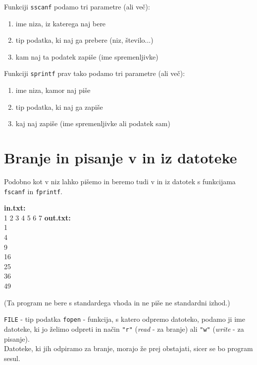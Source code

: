\documentclass{book}
\begin{document}
\noindent Funkciji \verb+sscanf+ podamo tri parametre (ali več):
\begin{enumerate}
	\item ime niza, iz katerega naj bere
	\item tip podatka, ki naj ga prebere (niz, število...)
	\item kam naj ta podatek zapiše (ime spremenljivke)
\end{enumerate}
	
\noindent Funkciji \verb+sprintf+ prav tako podamo tri parametre (ali več):
\begin{enumerate}
	\item ime niza, kamor naj piše
	\item tip podatka, ki naj ga zapiše
	\item kaj naj zapiše (ime spremenljivke ali podatek sam)
\end{enumerate}

\newpage
\section{Branje in pisanje v in iz datoteke}

Podobno kot v niz lahko pišemo in beremo tudi v in iz datotek s funkcijama \verb+fscanf+ in \verb+fprintf+.

\begin{examples}


\begin{inout}
{\color{blue} \bf in.txt:} \\
1 2 3 4 5 6 7
\tcblower
{\color{blue} \bf out.txt:} \\
1\\
4\\
9\\
16\\
25\\
36\\
49
\end{inout}

(Ta program ne bere s standardega vhoda in ne piše ne standardni izhod.)
\end{examples}

\verb+FILE+ - tip podatka
\verb+fopen+ - funkcija, s katero odpremo datoteko, podamo ji ime datoteke, ki
jo želimo odpreti in način \verb+"r"+ (\emph{read} - za branje) ali \verb+"w"+
(\emph{write} - za pisanje).\\ Datoteke, ki jih odpiramo za branje, morajo že
prej obstajati, sicer se bo program sesul. \\
\end{document}
